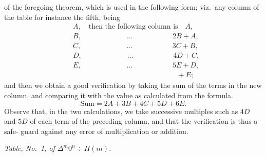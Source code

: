 \documentclass[11pt]{article}
\begin{document}
of the foregoing theorem, which is used in the following form; viz.\ any column of
the table for instance the fifth, being
\begin{align*}
   &A,\quad\text{then the following column is}\quad A,\\
   &B,\quad\quad\quad\quad\quad\quad\;\ldots\quad\quad\quad\quad\quad\;\; 2B + A,\\
   &C,\quad\quad\quad\quad\quad\quad\;\ldots\quad\quad\quad\quad\quad\;\; 3C + B,\\
   &D,\quad\quad\quad\quad\quad\quad\;\ldots\quad\quad\quad\quad\quad\;\; 4D + C,\\
   &E,\quad\quad\quad\quad\quad\quad\;\ldots\quad\quad\quad\quad\quad\;\; 5E + D,\\
   &\phantom{E,}\quad\quad\quad\quad\quad\quad\;\quad\quad\quad\quad\quad\quad\quad + E;
\end{align*}
and then we obtain a good verification by taking the sum of the terms in the new
column, and comparing it with the value as calculated from the formula.
\[
   \text{Sum} = 2A + 3B + 4C + 5D + 6E.
\]
Observe that, in the two calculations, we take successive multiples such as $4D$ and
$5D$ of each term of the preceding column, and that the verification is thus a safe-
guard against any error of multiplication or addition.

\bigskip

\begin{center}
\textit{Table, No.~1, of $\Delta^m 0^n \div \Pi(m)$.}
\end{center}

\medskip
\end{document}
